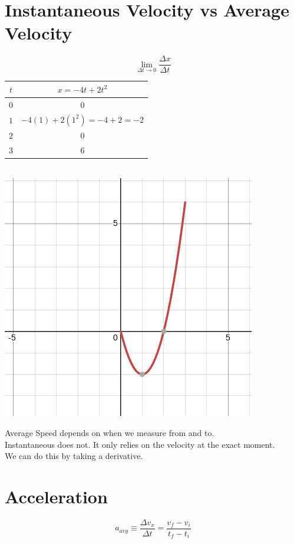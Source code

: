\documentclass[]{article}
\date{}
\title{\docTitle}
\author{\docAuthor}
\date{\today}
\begin{document}
\maketitle
\section*{Instantaneous Velocity vs Average Velocity}

\begin{equation*}
    \lim_{\Delta t \to 0} \frac{\Delta x}{\Delta t}  
\end{equation*}

\begin{tabular}{c|c}
    $t$&$x=-4t+2t^2$\\\hline
    $0$ & $0$\\
    $1$&$-4(1)+2(1^2) = -4+2 = -2$\\
    $2$ & $0$\\
    $3$ & $6$
\end{tabular}\\
\includegraphics*{Intantaneous1.png}

Average Speed depends on when we measure from and to.\\
Instantaneous does not. It only relies on the velocity at the exact moment.\\
We can do this by taking a derivative.

\section*{Acceleration}
\begin{equation*}
    a_{avg} \equiv \frac{\Delta v_x}{\Delta t} = \frac{v_f-v_i}{t_f-t_i}
\end{equation*}
\end{document}
